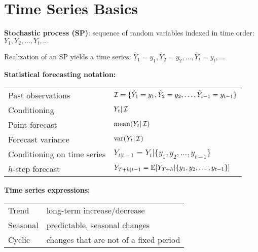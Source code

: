 
\section{Time Series Basics}

\textbf{Stochastic process (SP)}: sequence of random variables indexed in time order: $ Y_1, Y_2, \ldots, Y_t, \ldots $

Realization of an SP yields a time series: $ \hat{Y}_1=y_1, \hat{Y}_2=y_2, \ldots, \hat{Y}_t=y_t, \ldots $

\begin{minipage}[t]{0.55\textwidth}
\textbf{Statistical forecasting notation:}\\
\begin{tabular}{ll}
    Past observations & $\operatorname{\mathcal{I}} = \{\hat{Y}_1=y_1, \hat{Y}_2=y_2, \ldots, \hat{Y}_{t-1}=y_{t-1}\}$ \\
    Conditioning & $Y_t | \operatorname{\mathcal{I}}$ \\
    Point forecast & \(\operatorname{mean}(Y_t | \operatorname{\mathcal{I}})\) \\
    Forecast variance & \(\operatorname{var}(Y_t | \operatorname{\mathcal{I}})\) \\
    Conditioning on time series & $Y_{t|t-1} = Y_t | \{y_1, y_2, \ldots, y_{t-1}\}$ \\
    \(h\)-step forecast & \(Y_{T+h|t-1} = \operatorname{E}[Y_{T+h} | \{y_1, y_2, \ldots, y_{t-1}\}]\) \\
\end{tabular}
\end{minipage}
\hfill
\begin{minipage}[t]{0.40\textwidth}
\textbf{Time series expressions:}\\
\begin{tabular}{ll}
    Trend & long-term increase/decrease \\
    Seasonal & predictable, seasonal changes \\
    Cyclic & changes that are not of a fixed period \\
\end{tabular}
\end{minipage}

